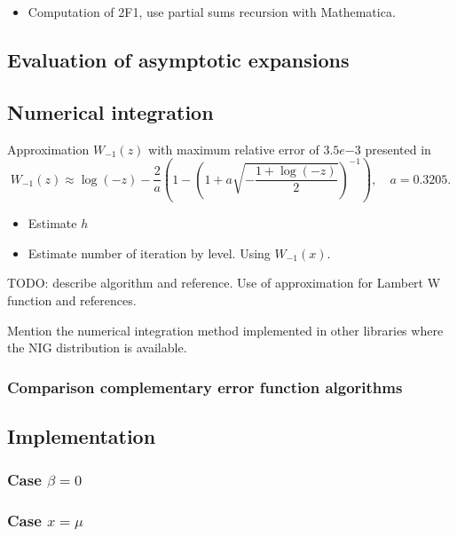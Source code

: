 \documentclass[10pt,a4paper,oneside]{article}
\numberwithin{equation}{section}
\begin{document}
\begin{itemize}
\item Computation of 2F1, use partial sums recursion with Mathematica.
\end{itemize}

\subsection{Evaluation of asymptotic expansions}\label{algorithmic_asymptotic_expansions}

\subsection{Numerical integration}\label{algorithmic_numerical_integration}

Approximation $W_{-1}(z)$ with maximum relative error of $3.5e{-3}$ presented in \cite{Barry2004}
\begin{equation}
W_{-1}(z) \approx \log(-z) - \frac{2}{a} \left(1 - \left(1 + a \sqrt{-\frac{1 + \log(-z)}{2}}\right)^{-1}\right), \quad	a = 0.3205.
\end{equation}


\begin{itemize}
\item Estimate $h$
\item Estimate number of iteration by level. Using $W_{-1}(x)$.
\end{itemize}

TODO: describe algorithm and reference. Use of approximation for Lambert W function and references.

Mention the numerical integration method implemented in other libraries where the NIG distribution is available.

\subsubsection{Comparison complementary error function algorithms}


\subsection{Implementation}\label{subsection_implementation}

\subsubsection{Case $\beta = 0$}
\subsubsection{Case $x = \mu$}
\end{document}
